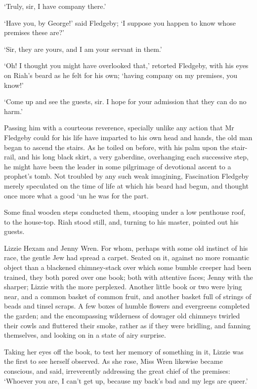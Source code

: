 ‘Truly, sir, I have company there.’

‘Have you, by George!’ said Fledgeby; ‘I suppose you happen to know
whose premises these are?’

‘Sir, they are yours, and I am your servant in them.’

‘Oh! I thought you might have overlooked that,’ retorted Fledgeby, with
his eyes on Riah’s beard as he felt for his own; ‘having company on my
premises, you know!’

‘Come up and see the guests, sir. I hope for your admission that they
can do no harm.’

Passing him with a courteous reverence, specially unlike any action that
Mr Fledgeby could for his life have imparted to his own head and hands,
the old man began to ascend the stairs. As he toiled on before, with his
palm upon the stair-rail, and his long black skirt, a very gaberdine,
overhanging each successive step, he might have been the leader in some
pilgrimage of devotional ascent to a prophet’s tomb. Not troubled by any
such weak imagining, Fascination Fledgeby merely speculated on the time
of life at which his beard had begun, and thought once more what a good
‘un he was for the part.

Some final wooden steps conducted them, stooping under a low penthouse
roof, to the house-top. Riah stood still, and, turning to his master,
pointed out his guests.

Lizzie Hexam and Jenny Wren. For whom, perhaps with some old instinct of
his race, the gentle Jew had spread a carpet. Seated on it, against
no more romantic object than a blackened chimney-stack over which some
bumble creeper had been trained, they both pored over one book; both
with attentive faces; Jenny with the sharper; Lizzie with the more
perplexed. Another little book or two were lying near, and a common
basket of common fruit, and another basket full of strings of beads and
tinsel scraps. A few boxes of humble flowers and evergreens completed
the garden; and the encompassing wilderness of dowager old chimneys
twirled their cowls and fluttered their smoke, rather as if they were
bridling, and fanning themselves, and looking on in a state of airy
surprise.

Taking her eyes off the book, to test her memory of something in it,
Lizzie was the first to see herself observed. As she rose, Miss Wren
likewise became conscious, and said, irreverently addressing the great
chief of the premises: ‘Whoever you are, I can’t get up, because my
back’s bad and my legs are queer.’

